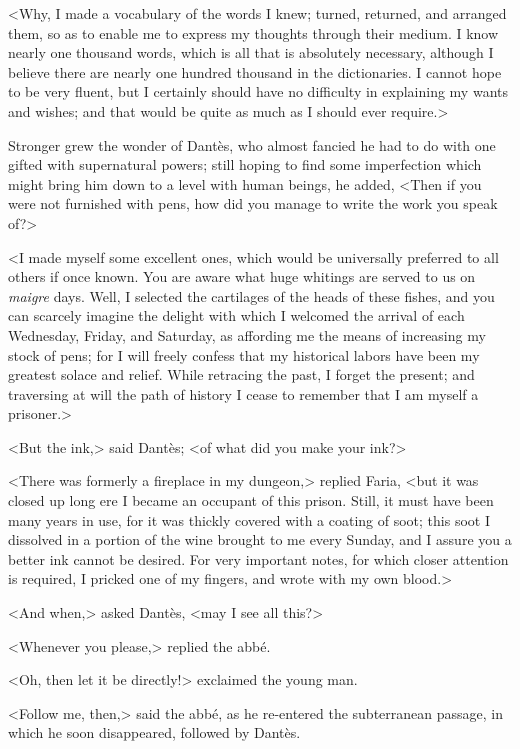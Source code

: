 <Why, I made a vocabulary of the words I knew; turned, returned, and arranged them, so as to enable me to express my thoughts through their medium. I know nearly one thousand words, which is all that is absolutely necessary, although I believe there are nearly one hundred thousand in the dictionaries. I cannot hope to be very fluent, but I certainly should have no difficulty in explaining my wants and wishes; and that would be quite as much as I should ever require.> 

 Stronger grew the wonder of Dantès, who almost fancied he had to do with one gifted with supernatural powers; still hoping to find some imperfection which might bring him down to a level with human beings, he added, <Then if you were not furnished with pens, how did you manage to write the work you speak of?> 

 <I made myself some excellent ones, which would be universally preferred to all others if once known. You are aware what huge whitings are served to us on \textit{maigre} days. Well, I selected the cartilages of the heads of these fishes, and you can scarcely imagine the delight with which I welcomed the arrival of each Wednesday, Friday, and Saturday, as affording me the means of increasing my stock of pens; for I will freely confess that my historical labors have been my greatest solace and relief. While retracing the past, I forget the present; and traversing at will the path of history I cease to remember that I am myself a prisoner.> 

 <But the ink,> said Dantès; <of what did you make your ink?> 

 <There was formerly a fireplace in my dungeon,> replied Faria, <but it was closed up long ere I became an occupant of this prison. Still, it must have been many years in use, for it was thickly covered with a coating of soot; this soot I dissolved in a portion of the wine brought to me every Sunday, and I assure you a better ink cannot be desired. For very important notes, for which closer attention is required, I pricked one of my fingers, and wrote with my own blood.> 

 <And when,> asked Dantès, <may I see all this?> 

 <Whenever you please,> replied the abbé. 

 <Oh, then let it be directly!> exclaimed the young man. 

 <Follow me, then,> said the abbé, as he re-entered the subterranean passage, in which he soon disappeared, followed by Dantès. 